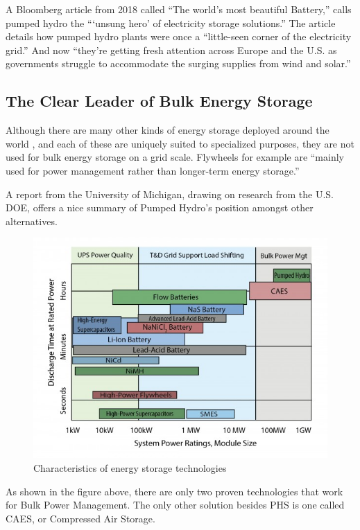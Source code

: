 \documentclass[hidelinks,12pt,a4paper]{article}
\begin{document}
A Bloomberg article from 2018 called “The world's most beautiful Battery,” calls pumped hydro the “‘unsung hero’ of electricity storage solutions.” \cite{MostBeautifulBattery} The article details how pumped hydro plants were once a “little-seen corner of the electricity grid.” And now “they’re getting fresh attention across Europe and the U.S. as governments struggle to accommodate the surging supplies from wind and solar.” \cite{MostBeautifulBattery}

\subsection{The Clear Leader of Bulk Energy Storage}
Although there are many other kinds of energy storage deployed around the world \cite{OpenListOfNonPumpedStorageProjects}, and each of these are uniquely suited to specialized purposes, they are not used for bulk energy storage on a grid scale. Flywheels for example are “mainly used for power management rather than longer-term energy storage.” \cite{USGridEnergyStorageFactsheet}

A report from the University of Michigan, drawing on research from the U.S. DOE, offers a nice summary of Pumped Hydro's position amongst other alternatives.

\begin{figure}[ht!]
    \centering
    \includegraphics[width=.75\textwidth]{characteristics-of-energy-storage-technologies.jpg}
    \caption{Characteristics of energy storage technologies \cite{USGridEnergyStorageFactsheet}}
\end{figure}
\FloatBarrier

As shown in the figure above, there are only two proven technologies that work for Bulk Power Management. The only other solution besides PHS is one called CAES, or Compressed Air Storage.
\end{document}
